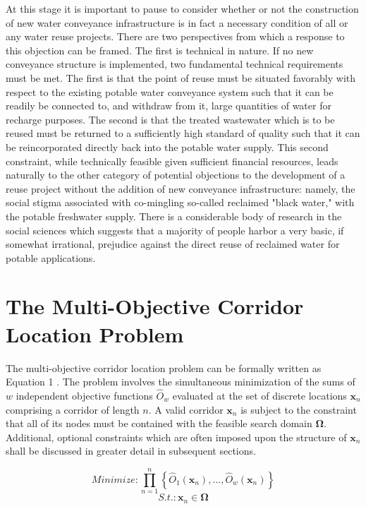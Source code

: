 At this stage it is important to pause to consider whether or not the construction of new water conveyance infrastructure is in fact a necessary condition of all or any water reuse projects. There are two perspectives from which a response to this objection can be framed. The first is technical in nature. If no new conveyance structure is implemented, two fundamental technical requirements must be met. The first is that the point of reuse must be situated favorably with respect to the existing potable water conveyance system such that it can be readily be connected to, and withdraw from it, large quantities of water for recharge purposes. The second is that the treated wastewater which is to be reused must be returned to a sufficiently high standard of quality such that it can be reincorporated directly back into the potable water supply. This second constraint, while technically feasible given sufficient financial resources, leads naturally to the other category of potential objections to the development of a reuse project without the addition of new conveyance infrastructure: namely, the social stigma associated with co-mingling so-called reclaimed "black water," with the potable freshwater supply. There is a considerable body of research in the social sciences which suggests that a majority of people harbor a very basic, if somewhat irrational, prejudice against the direct reuse of reclaimed water for potable applications. 
            
\section{The Multi-Objective Corridor Location Problem}
            
The multi-objective corridor location problem can be formally written as Equation 1 \cite{Zhou2011}. The problem involves the simultaneous minimization of the sums of $w$ independent objective functions $\hat{O}_w$ evaluated at the set of discrete locations $\textbf{x}_n$ comprising a corridor of length $n$. A valid corridor $\textbf{x}_n$ is subject to the constraint that all of its nodes must be contained with the feasible search domain $\boldsymbol{\Omega}$. Additional, optional constraints which are often imposed upon the structure of $\textbf{x}_n$ shall be discussed in greater detail in subsequent sections.
            
            \begin{equation}
            Minimize: \prod\limits_{n=1}^n \left\{\hat{O}_1(\textbf{x}_n), \dots, \hat{O}_w(\textbf{x}_n)\right\} 
            \end{equation}
            \begin{equation}
            S.t.: \textbf{x}_n \in \boldsymbol\Omega
            \end{equation}
            
